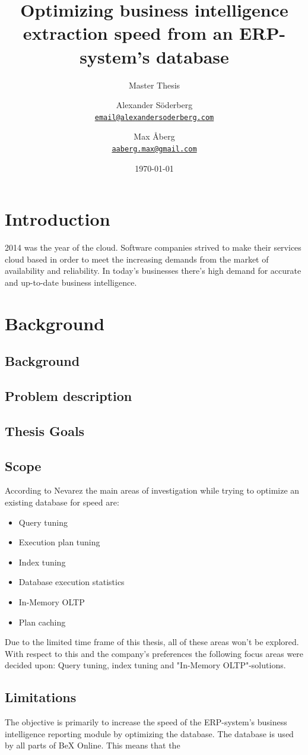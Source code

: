 \documentclass{cslthse-msc}
\author{
	Alexander Söderberg \\
	{\normalsize \href{mailto:email@alexandersoderberg.com}{\texttt{email@alexandersoderberg.com}}}
	\and
	Max Åberg \\
    {\normalsize \href{mailto:aaberg.max@gmail.com}{\texttt{aaberg.max@gmail.com}}}
}
\title{Optimizing business intelligence
extraction speed from an
ERP-system’s database}
\subtitle{Master Thesis}
\date{\today}
\begin{document}
\makefrontmatter
\chapter[Introduction]{Introduction}
2014 was the year of the cloud. Software companies strived to make their services cloud based in order to meet the increasing demands from the market of availability and reliability. 
In today's businesses there's high demand for accurate and up-to-date business intelligence.

\chapter{Background}

\section{Background}

\section{Problem description}

\section{Thesis Goals}

\section{Scope}
According to Nevarez \cite{Nevarez} the main areas of investigation while trying to optimize an existing database for speed are:
\begin{itemize}
\item Query tuning
\item Execution plan tuning
\item Index tuning
\item Database execution statistics
\item In-Memory OLTP
\item Plan caching
\end{itemize}
Due to the limited time frame of this thesis, all of these areas won't be explored. With respect to this and the company's preferences the following focus areas were decided upon: Query tuning, index tuning and "In-Memory OLTP"-solutions.

\section{Limitations}
The objective is primarily to increase the speed of the ERP-system's business intelligence reporting module by optimizing the database. The database is used by all parts of BeX Online. This means that the 
\end{document}
